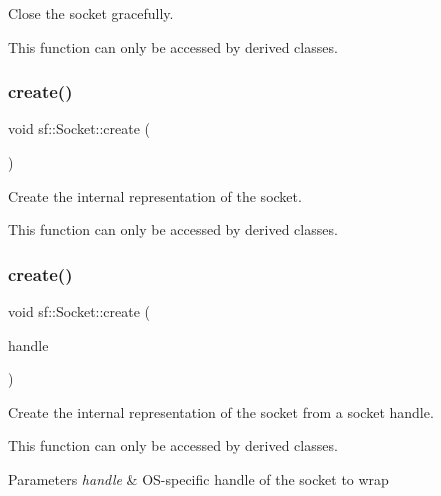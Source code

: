 Close the socket gracefully. 

This function can only be accessed by derived classes. \begin{DoxyVerb}\end{DoxyVerb}
 \mbox{\label{classsf_1_1_socket_aafbe140f4b1921e0d19e88cf7a61dcbc}} 
\subsubsection{\texorpdfstring{create()}{create()}\hspace{0.1cm}{\footnotesize\ttfamily [1/2]}}
{\footnotesize\ttfamily void sf\+::\+Socket\+::create (\begin{DoxyParamCaption}{ }\end{DoxyParamCaption})\hspace{0.3cm}{\ttfamily [protected]}}



Create the internal representation of the socket. 

This function can only be accessed by derived classes. \begin{DoxyVerb}\end{DoxyVerb}
 \mbox{\label{classsf_1_1_socket_af1dd898f7aa3ead7ff7b2d1c20e97781}} 
\subsubsection{\texorpdfstring{create()}{create()}\hspace{0.1cm}{\footnotesize\ttfamily [2/2]}}
{\footnotesize\ttfamily void sf\+::\+Socket\+::create (\begin{DoxyParamCaption}\item[{Socket\+Handle}]{handle }\end{DoxyParamCaption})\hspace{0.3cm}{\ttfamily [protected]}}



Create the internal representation of the socket from a socket handle. 

This function can only be accessed by derived classes.


\begin{DoxyParams}{Parameters}
{\em handle} & O\+S-\/specific handle of the socket to wrap \begin{DoxyVerb}\end{DoxyVerb}
 \\
\hline
\end{DoxyParams}
\mbox{\label{classsf_1_1_socket_a675457784284ae2f5640bbbe16729393}} 
